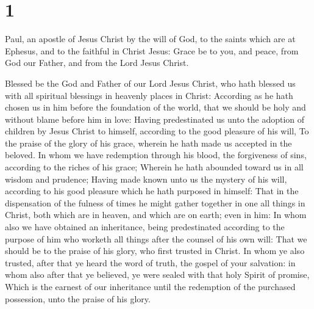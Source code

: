\hypertarget{section}{%
\section{1}\label{section}}

 Paul, an apostle of Jesus Christ by the will of God, to
the saints which are at Ephesus, and to the faithful in Christ Jesus:
 Grace be to you, and peace, from God our Father, and from
the Lord Jesus Christ.

 Blessed be the God and Father of our Lord Jesus Christ,
who hath blessed us with all spiritual blessings in heavenly places in
Christ:  According as he hath chosen us in him before the
foundation of the world, that we should be holy and without blame before
him in love:  Having predestinated us unto the adoption of
children by Jesus Christ to himself, according to the good pleasure of
his will,  To the praise of the glory of his grace,
wherein he hath made us accepted in the beloved.  In whom
we have redemption through his blood, the forgiveness of sins, according
to the riches of his grace;  Wherein he hath abounded
toward us in all wisdom and prudence;  Having made known
unto us the mystery of his will, according to his good pleasure which he
hath purposed in himself:  That in the dispensation of
the fulness of times he might gather together in one all things in
Christ, both which are in heaven, and which are on earth; even in him:
 In whom also we have obtained an inheritance, being
predestinated according to the purpose of him who worketh all things
after the counsel of his own will:  That we should be to
the praise of his glory, who first trusted in Christ.  In
whom ye also trusted, after that ye heard the word of truth, the gospel
of your salvation: in whom also after that ye believed, ye were sealed
with that holy Spirit of promise,  Which is the earnest
of our inheritance until the redemption of the purchased possession,
unto the praise of his glory.

